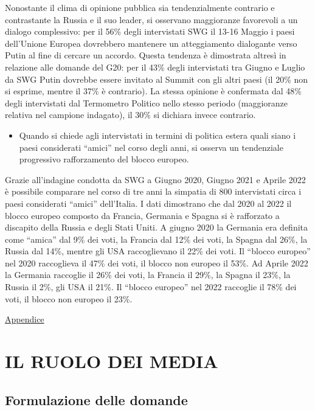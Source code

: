 \documentclass[
]{book}
\providecommand{\tightlist}{%
  \setlength{\itemsep}{0pt}\setlength{\parskip}{0pt}}
\begin{document}
Nonostante il clima di opinione pubblica sia tendenzialmente contrario e contrastante la Russia e il suo leader, si osservano maggioranze favorevoli a un dialogo complessivo: per il 56\% degli intervistati SWG il 13-16 Maggio i paesi dell'Unione Europea dovrebbero mantenere un atteggiamento dialogante verso Putin al fine di cercare un accordo.
Questa tendenza è dimostrata altresì in relazione alle domande del G20: per il 43\% degli intervistati tra Giugno e Luglio da SWG Putin dovrebbe essere invitato al Summit con gli altri paesi (il 20\% non si esprime, mentre il 37\% è contrario). La stessa opinione è confermata dal 48\% degli intervistati dal Termometro Politico nello stesso periodo (maggioranze relativa nel campione indagato), il 30\% si dichiara invece contrario.

\begin{itemize}
\tightlist
\item
  Quando si chiede agli intervistati in termini di politica estera quali siano i paesi considerati ``amici'' nel corso degli anni, si osserva un tendenziale progressivo rafforzamento del blocco europeo.
\end{itemize}

Grazie all'indagine condotta da SWG a Giugno 2020, Giugno 2021 e Aprile 2022 è possibile comparare nel corso di tre anni la simpatia di 800 intervistati circa i paesi considerati ``amici'' dell'Italia. I dati dimostrano che dal 2020 al 2022 il blocco europeo composto da Francia, Germania e Spagna si è rafforzato a discapito della Russia e degli Stati Uniti.
A giugno 2020 la Germania era definita come ``amica'' dal 9\% dei voti, la Francia dal 12\% dei voti, la Spagna dal 26\%, la Russia dal 14\%, mentre gli USA raccoglievano il 22\% dei voti. Il ``blocco europeo'' nel 2020 raccoglieva il 47\% dei voti, il blocco non europeo il 53\%.
Ad Aprile 2022 la Germania raccoglie il 26\% dei voti, la Francia il 29\%, la Spagna il 23\%, la Russia il 2\%, gli USA il 21\%. Il ``blocco europeo'' nel 2022 raccoglie il 78\% dei voti, il blocco non europeo il 23\%.

\href{https://github.com/LucianaFazio/Ucrania/blob/main/PDF_Appendice/VII.\%20Il\%20clima\%20di\%20opinione\%20v.3.pdf}{Appendice}

\hypertarget{il-ruolo-dei-media}{%
\chapter{IL RUOLO DEI MEDIA}\label{il-ruolo-dei-media}}

\hypertarget{formulazione-delle-domande-6}{%
\section{Formulazione delle domande}\label{formulazione-delle-domande-6}}
\end{document}
